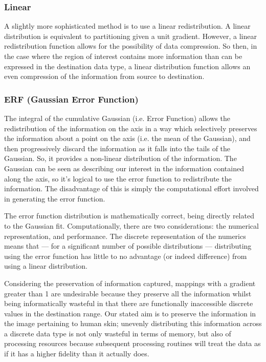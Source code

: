 \documentclass[10pt,a4paper]{article}
\begin{document}
\subsubsection{Linear}\label{sec:Linear}
A slightly more sophisticated method is to use a linear redistribution. A linear distribution is equivalent to partitioning given a unit gradient. However, a linear redistribution function allows for the possibility of data compression. So then, in the case where the region of interest contains more information than can be expressed in the destination data type, a linear distribution function allows an even compression of the information from source to destination.

\subsubsection{ERF (Gaussian Error Function)}\label{sec:ERF}
The integral of the cumulative Gaussian (i.e. Error Function) allows the redistribution of the information on the axis in a way which selectively preserves the information about a point on the axis (i.e. the mean of the Gaussian), and then progressively discard the information as it falls into the tails of the Gaussian. So, it provides a non-linear distribution of the information. The Gaussian can be seen as describing our interest in the information contained along the axis, so it's logical to use the error function to redistribute the information. The disadvantage of this is simply the computational effort involved in generating the error function.

The error function distribution is mathematically correct, being directly related to the Gaussian fit. Computationally, there are two considerations: the numerical representation, and performance. The discrete representation of the numerics means that --- for a significant number of possible distributions --- distributing using the error function has little to no advantage (or indeed difference) from using a linear distribution.

Considering the preservation of information captured, mappings with a gradient greater than 1 are undesirable because they preserve all the information whilst being informatically wasteful in that there are functionally inaccessible discrete values in the destination range. Our stated aim is to preserve the information in the image pertaining to human skin; unevenly distributing this information across a discrete data type is not only wasteful in terms of memory, but also of processing resources because subsequent processing routines will treat the data as if it has a higher fidelity than it actually does.
\end{document}

